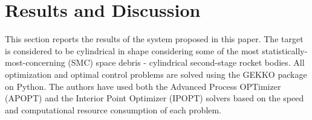 \section{Results and Discussion}
\label{sec:results}
This section reports the results of the system proposed in this paper.
The target is considered to be cylindrical in shape considering some of the most statistically-most-concerning (SMC) space debris \cite{mcknight2021identifying} - cylindrical second-stage rocket bodies.
All optimization and optimal control problems are solved using the GEKKO package \cite{beal2018gekko} on Python.
The authors have used both the Advanced Process OPTimizer (APOPT) \cite{hedengren2014nonlinear} and the Interior Point Optimizer (IPOPT) \cite{wachter2006on} solvers based on the speed and computational resource consumption of each problem.

